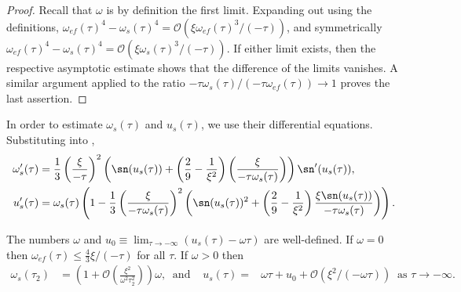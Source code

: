 \begin{proof}
Recall that $\omega$ is by definition the first limit. Expanding out using the definitions, $\omega_{ef}(\tau)^{4}-\omega_{s}(\tau)^{4}=\mathcal{O}(\xi\omega_{ef}(\tau)^{3}/(-\tau))$, and symmetrically $\omega_{ef}(\tau)^{4}-\omega_{s}(\tau)^{4}=\mathcal{O}(\xi\omega_{s}(\tau)^{3}/(-\tau))$. If either limit exists, then the respective asymptotic estimate shows that the difference of the limits vanishes. A similar argument applied to the ratio $-\tau\omega_{s}(\tau)/(-\tau\omega_{ef}(\tau))\to1$ proves the last assertion. 
\end{proof}
In order to estimate $\omega_{s}(\tau)$ and $u_{s}(\tau)$, we use their differential equations. Substituting  into , 
\begin{align}
\omega_{s}'(\tau) & =\frac{1}{3}\left(\frac{\xi}{-\tau}\right)^{2}\left(\sn(u_{s}(\tau))+\left(\frac{2}{9}-\frac{1}{\xi^{2}}\right)\left(\frac{\xi}{-\tau\omega_{s}(\tau)}\right)\right)\sn'(u_{s}(\tau)),\label{eq:omega-eom}\\
u_{s}'(\tau) & =\omega_{s}(\tau)\left(1-\frac{1}{3}\left(\frac{\xi}{-\tau\omega_{s}(\tau)}\right)^{2}\left(\sn(u_{s}(\tau))^{2}+\left(\frac{2}{9}-\frac{1}{\xi^{2}}\right)\frac{\xi\sn(u_{s}(\tau))}{-\tau\omega_{s}(\tau)}\right)\right).\label{eq:u-eom}
\end{align}

\begin{thm}
\label{thm:omega-s}The numbers $\omega$ and $u_{0}\equiv\lim_{\tau\to-\infty}\left(u_{s}(\tau)-\omega\tau\right)$ are well-defined. If $\omega=0$ then $\omega_{ef}(\tau)\leq\tfrac{4}{3}\xi/(-\tau)$ for all $\tau$. If $\omega>0$ then 
\begin{align*}
\omega_{s}(\tau_{2}) & =\left(1+\mathcal{O}\left(\frac{\xi^{2}}{\omega^{2}\tau_{2}^{2}}\right)\right)\omega,\ \textrm{ and } & u_{s}(\tau)= & \omega\tau+u_{0}+\mathcal{O}(\xi^{2}/(-\omega\tau))\ \textrm{ as }\tau\to-\infty.
\end{align*}
\end{thm}

